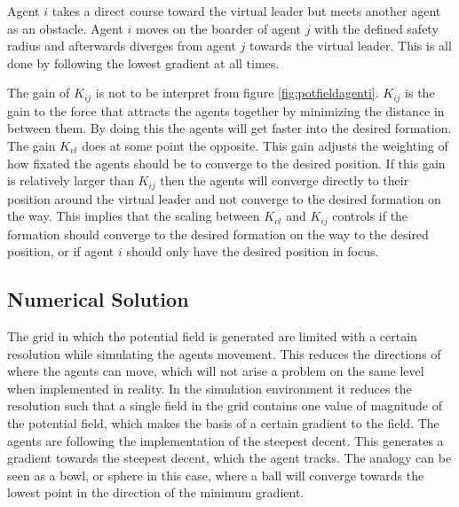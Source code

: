 \documentclass[a4paper,conference]{IEEEtran}
\begin{document}
Agent $i$ takes a direct course toward the virtual leader but meets
another agent as an obstacle. Agent $i$ moves on the boarder of agent
$j$ with the defined safety radius and afterwards diverges from agent
$j$ towards the virtual leader. This is all done by following the
lowest gradient at all times.

The gain of $K_{ij}$ is not to be interpret from figure
\ref{fig:potfieldagenti}. $K_{ij}$ is the gain to the force that
attracts the agents together by minimizing the distance in between
them. By doing this the agents will get faster into the desired
formation. The gain $K_{vl}$ does at some point the opposite. This
gain adjusts the weighting of how fixated the agents should be to
converge to the desired position. If this gain is relatively larger
than $K_{ij}$ then the agents will converge directly to their position
around the virtual leader and not converge to the desired formation on
the way. This implies that the scaling between $K_{vl}$ and $K_{ij}$
controls if the formation should converge to the desired formation on
the way to the desired position, or if agent $i$ should only have the
desired position in focus.

\subsection{Numerical Solution}
\label{subsec:numsol}
The grid in which the potential field is generated are limited with a
certain resolution while simulating the agents movement. This reduces
the directions of where the agents can move, which will not arise a
problem on the same level when implemented in reality. In the
simulation environment it reduces the resolution such that a single
field in the grid contains one value of magnitude of the potential
field, which makes the basis of a certain gradient to the field. The
agents are following the implementation of the steepest decent. This
generates a gradient towards the steepest decent, which the agent
tracks. The analogy can be seen as a bowl, or sphere in this case,
where a ball will converge towards the lowest point in the direction
of the minimum gradient.
\end{document}
